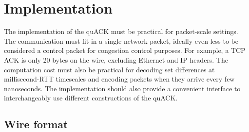 


\section{Implementation}
\label{sec:quack:implementation}

The implementation of the quACK must be practical for packet-scale settings. The
communication must fit in a single network packet, ideally even less to be
considered a control packet for congestion control purposes. For example, a TCP
ACK is only 20 bytes on the wire, excluding Ethernet and IP headers. The
computation cost must also be practical for decoding set differences at
millisecond-RTT timescales and encoding packets when they arrive every few
nanoseconds. The implementation should also provide a convenient interface to
interchangeably use different constructions of the quACK.

\subsection{Wire format}

